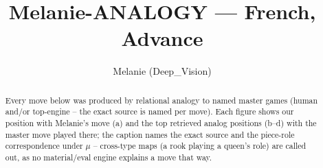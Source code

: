 \documentclass[11pt]{article}
\title{Melanie-ANALOGY — French, Advance}
\author{Melanie (Deep\_Vision)}
\date{}
\begin{document}
\maketitle

\begin{abstract}Every move below was produced by relational analogy to named master games (human and/or top-engine -- the exact source is named per move). Each figure shows our position with Melanie's move (a) and the top retrieved analog positions (b--d) with the master move played there; the caption names the exact source and the piece-role correspondence under $\mu$ -- cross-type maps (a rook playing a queen's role) are called out, as no material/eval engine explains a move that way.\end{abstract}

\begin{figure}[p]\centering
\begin{subfigure}{0.46\textwidth}\centering
\resizebox{\linewidth}{!}{%
\newchessgame
\chessboard[
  setfen={r3kbnr/pp1b1ppp/1qn1p3/2ppP3/3P4/P1P2N2/1P3PPP/RNBQKB1R w KQkq - 1 7},
  showmover=false,
  pgfstyle=straightmove, color=movearrow, markmove={a1-a2}
]}
\caption{}
\end{subfigure}\hfill
\begin{subfigure}{0.46\textwidth}\centering
\resizebox{\linewidth}{!}{%
\newchessgame
\chessboard[
  setfen={r1b1kbnr/pp3ppp/1qn1p3/2ppP3/3P4/2P2N2/PP3PPP/RNBQKB1R w KQkq - 3 6},
  showmover=false,
  pgfstyle=straightmove, color=movearrow, markmove={a2-a3}
]}
\caption{}
\end{subfigure}
\\[4pt]
\begin{subfigure}{0.46\textwidth}\centering
\resizebox{\linewidth}{!}{%
\newchessgame
\chessboard[
  setfen={r1b1kbnr/pp3ppp/1qn1p3/2ppP3/3P4/2P2N2/PP3PPP/RNBQKB1R w KQkq - 3 6},
  showmover=false,
  pgfstyle=straightmove, color=movearrow, markmove={a2-a3}
]}
\caption{}
\end{subfigure}\hfill
\begin{subfigure}{0.46\textwidth}\centering
\resizebox{\linewidth}{!}{%
\newchessgame
\chessboard[
  setfen={r1b1kbnr/pp3ppp/1qn1p3/2ppP3/3P4/2P2N2/PP3PPP/RNBQKB1R w KQkq - 3 6},
  showmover=false,
  pgfstyle=straightmove, color=movearrow, markmove={a2-a3}
]}
\caption{}
\end{subfigure}

\end{figure}
\end{document}
